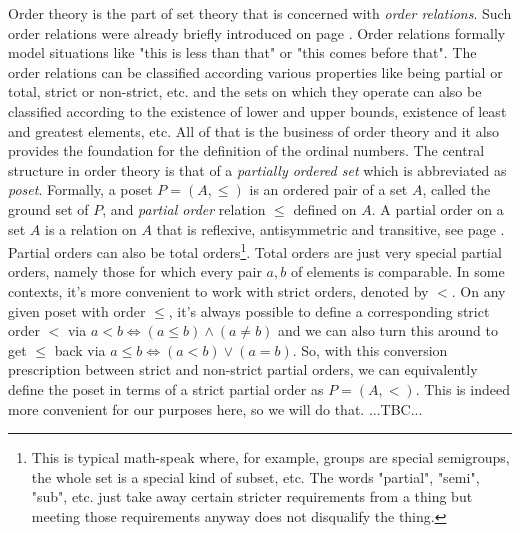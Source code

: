 Order theory is the part of set theory that is concerned with \emph{order relations}. Such order relations were already briefly introduced on page \pageref{Par:Orders}. Order relations formally model situations like "this is less than that" or "this comes before that". The order relations can be classified according various properties like being partial or total, strict or non-strict, etc. and the sets on which they operate can also be classified according to the existence of lower and upper bounds, existence of least and greatest elements, etc. All of that is the business of order theory and it also provides the foundation for the definition of the ordinal numbers. The central structure in order theory is that of a \emph{partially ordered set} which is abbreviated as \emph{poset}. Formally, a poset $P = (A, \leq)$ is an ordered pair of a set $A$, called the ground set of $P$, and \emph{partial order} relation $\leq$ defined on $A$. A partial order on a set $A$ is a relation on $A$ that is reflexive, antisymmetric and transitive, see page \pageref{Tab:RelationFeatures}. Partial orders can also be total orders\footnote{This is typical math-speak where, for example, groups are special semigroups, the whole set is a special kind of subset, etc. The words "partial", "semi", "sub", etc. just take away certain stricter requirements from a thing but meeting those requirements anyway does not disqualify the thing.}. Total orders are just very special partial orders, namely those for which every pair $a,b$ of elements is comparable. In some contexts, it's more convenient to work with strict orders, denoted by $<$. On any given poset with order $\leq$, it's always possible to define a corresponding strict order $<$ via $a < b \Leftrightarrow (a \leq b) \wedge (a \neq b)$ and we can also turn this around to get $\leq$ back via $a \leq b \Leftrightarrow (a < b) \vee (a = b)$. So, with this conversion prescription between strict and non-strict partial orders, we can equivalently define the poset in terms of a strict partial order as $P = (A, <)$. This is indeed more convenient for our purposes here, so we will do that. ...TBC...



